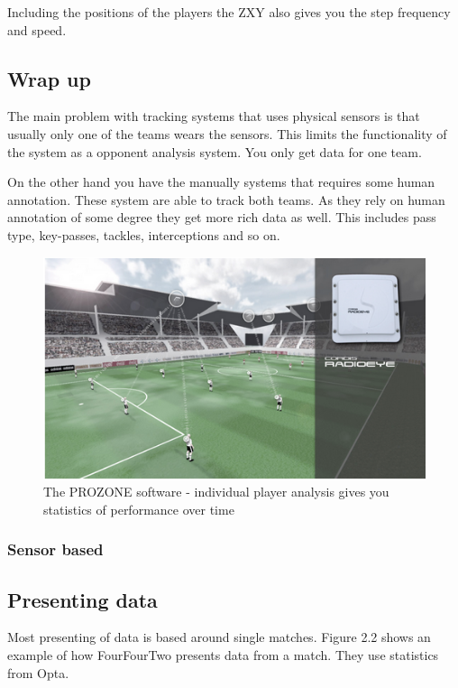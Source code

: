 Including the positions of the players the ZXY also gives you the step frequency and speed. 

\subsection{Wrap up}
The main problem with tracking systems that uses physical sensors is that usually only one of the teams wears the sensors.  This limits the functionality of the system as a opponent analysis system. You only get data for one team. 

On the other hand you have the manually systems that requires some human annotation. These system are able to track both teams. As they rely on human annotation of some degree they get more rich data as well. This includes pass type, key-passes, tackles, interceptions and so on. 

\begin{figure}[ht!]
\centering
\includegraphics[width=150mm]{images/general/zxyoverview.png}
\caption{The PROZONE software - individual player analysis gives you statistics of performance over time}
\label{overflow}
\end{figure}


\subsubsection{Sensor based}


\subsection{Presenting data}

Most presenting of data is based around single matches. Figure 2.2 shows an example of how FourFourTwo presents data from a match. They use statistics from Opta. 

